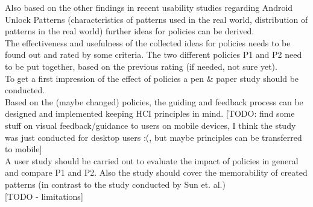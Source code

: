 \documentclass[twocolumn, a4paper, 10pt]{article}
\begin{document}
Also based on the other findings in recent usability studies regarding Android Unlock Patterns (characteristics of patterns used in the real world, distribution of patterns in the real world) further ideas for policies can be derived.\\

The effectiveness and usefulness of the collected ideas for policies needs to be found out and rated by some criteria. The two different policies P1 and P2 need to be put together, based on the previous rating (if needed, not sure yet).\\

To get a first impression of the effect of policies a pen \& paper study should be conducted.\\

Based on the (maybe changed) policies, the guiding and feedback process can be designed and implemented keeping HCI principles in mind. [TODO: find some stuff on visual feedback/guidance to users on mobile devices, I think the study was just conducted for desktop users :(, but maybe principles can be transferred to mobile]\\

A user study should be carried out to evaluate the impact of policies in general and compare P1 and P2. Also the study should cover the memorability of created patterns (in contrast to the study conducted by Sun et. al.)\\

[TODO - limitations]

{
	
	
}

\appendix
\end{document}
